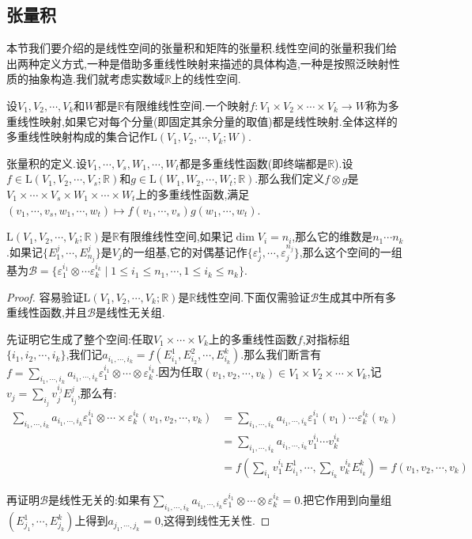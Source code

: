 \subsection{张量积}

本节我们要介绍的是线性空间的张量积和矩阵的张量积.线性空间的张量积我们给出两种定义方式,一种是借助多重线性映射来描述的具体构造,一种是按照泛映射性质的抽象构造.我们就考虑实数域$\mathbb{R}$上的线性空间.

设$V_1,V_2,\cdots,V_k$和$W$都是$\mathbb{R}$有限维线性空间.一个映射$f:V_1\times V_2\times\cdots\times V_k\to W$称为多重线性映射,如果它对每个分量(即固定其余分量的取值)都是线性映射.全体这样的多重线性映射构成的集合记作$\mathrm{L}(V_1,V_2,\cdots,V_k;W)$.

张量积的定义.设$V_1,\cdots,V_s,W_1,\cdots,W_t$都是多重线性函数(即终端都是$\mathbb{R}$).设$f\in\mathrm{L}(V_1,V_2,\cdots,V_s;\mathbb{R})$和$g\in\mathrm{L}(W_1,W_2,\cdots,W_t;\mathbb{R})$.那么我们定义$f\otimes g$是$V_1\times\cdots\times V_s\times W_1\times\cdots\times W_t$上的多重线性函数,满足$(v_1,\cdots,v_s,w_1,\cdots,w_t)\mapsto f(v_1,\cdots,v_s)g(w_1,\cdots,w_t)$.

$\mathrm{L}(V_1,V_2,\cdots,V_k;\mathbb{R})$是$\mathbb{R}$有限维线性空间,如果记$\dim V_i=n_i$,那么它的维数是$n_1\cdots n_k$.如果记$\{E_1^{j},\cdots,E_{n_j}^j\}$是$V_j$的一组基,它的对偶基记作$\{\varepsilon_j^1,\cdots,\varepsilon_j^{n_j}\}$,那么这个空间的一组基为$\mathscr{B}=\{\varepsilon_1^{i_1}\otimes\cdots\varepsilon_k^{i_k}\mid1\le i_1\le n_1,\cdots,1\le i_k\le n_k\}$.
\begin{proof}
	
	容易验证$\mathrm{L}(V_1,V_2,\cdots,V_k;\mathbb{R})$是$\mathbb{R}$线性空间.下面仅需验证$\mathscr{B}$生成其中所有多重线性函数,并且$\mathscr{B}$是线性无关组.
	
	先证明它生成了整个空间:任取$V_1\times\cdots\times V_k$上的多重线性函数$f$,对指标组$\{i_1,i_2,\cdots,i_k\}$,我们记$a_{i_1,\cdots,i_k}=f(E_{i_1}^1,E_{i_2}^2,\cdots,E_{i_k}^k)$.那么我们断言有$f=\sum_{i_1,\cdots,i_k}a_{i_1,\cdots,i_k}\varepsilon_1^{i_1}\otimes\cdots\otimes\varepsilon_k^{i_k}$.因为任取$(v_1,v_2,\cdots,v_k)\in V_1\times V_2\times\cdots\times V_k$,记$v_j=\sum_{i_j}v_j^{i_j}E_{i_j}^j$,那么有:
	\begin{align*}
	\sum_{i_1,\cdots,i_k}a_{i_1,\cdots,i_k}\varepsilon_1^{i_1}\otimes\cdots\times\varepsilon_k^{i_k}(v_1,v_2,\cdots,v_k)&=\sum_{i_1,\cdots,i_k}a_{i_1,\cdots,i_k}\varepsilon_1^{i_1}(v_1)\cdots\varepsilon_k^{i_k}(v_k)\\&=\sum_{i_1,\cdots,i_k}a_{i_1,\cdots,i_k}v_1^{i_1}\cdots v_k^{i_k}\\&=f(\sum_{i_1}v_1^{i_1}E_{i_1}^1,\cdots,\sum_{i_k}v_k^{i_k}E_{i_k}^k)=f(v_1,v_2,\cdots,v_k)
	\end{align*}
	
	再证明$\mathscr{B}$是线性无关的:如果有$\sum_{i_1,\cdots,i_k}a_{i_1,\cdots,i_k}\varepsilon_1^{i_1}\otimes\cdots\otimes\varepsilon_k^{i_k}=0$.把它作用到向量组$(E_{j_1}^1,\cdots,E_{j_k}^k)$上得到$a_{j_1,\cdots,j_k}=0$,这得到线性无关性.
\end{proof}

